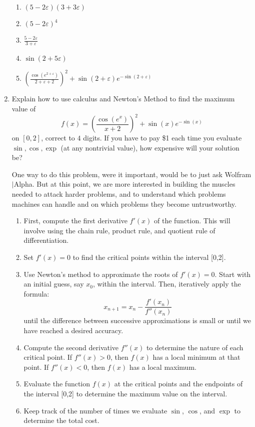 \documentclass[10pt]{article}
\newcommand{\answerbox}[1]{\todo[inline,author={Kartik},color=lightgray,size=normalsize]{#1}}
\theoremstyle{definition}
\begin{document}
\begin{enumerate}[noitemsep]
\begin{enumerate}
        \item $(5-2\varepsilon)(3+3\varepsilon)$
        \answerbox{$15+9\varepsilon$}

        \item $(5-2\varepsilon)^4$
        \answerbox{$625-1000\varepsilon$}

        \item $\displaystyle \frac{5-2\varepsilon}{3+\varepsilon}$
        \answerbox{$\frac{15}{9}-\frac{11}{9}\varepsilon$}

        \item $\sin(2+5\varepsilon)$
        \answerbox{$\sin(2)+5\cos{2} \varepsilon$}

        \item $\displaystyle \left(\frac{\cos \left(e^{2+\varepsilon}\right)}{2+\varepsilon+2}\right)^2+\sin (2+\varepsilon) e^{-\sin (2+\varepsilon)}$
        \answerbox{Confused}

    \end{enumerate}
    \item Explain how to use calculus and Newton's Method to find the maximum value of $$f(x)=\left(\frac{\cos \left(e^x\right)}{x+2}\right)^2+\sin (x) e^{-\sin (x)}$$ on $[0,2]$, correct to $4$ digits. If you have to pay \$1 each time you evaluate $\sin,\cos,\exp$ (at any nontrivial value), how expensive will your solution be?

    One way to do this problem, were it important, would be to just ask Wolfram$\mid$Alpha. But at this point, we are more interested in building the muscles needed to attack harder problems, and to understand which problems machines can handle and on which problems they become untrustworthy.

    \begin{enumerate}
    \item First, compute the first derivative \(f'(x)\) of the function. This will involve using the chain rule, product rule, and quotient rule of differentiation.
    \item Set \(f'(x) = 0\) to find the critical points within the interval [0,2].
    \item Use Newton's method to approximate the roots of \(f'(x) = 0\). Start with an initial guess, say \(x_0\), within the interval. Then, iteratively apply the formula:
    \[ x_{n+1} = x_n - \frac{f'(x_n)}{f''(x_n)} \]
    until the difference between successive approximations is small or until we have reached a desired accuracy.
    \item Compute the second derivative \(f''(x)\) to determine the nature of each critical point. If \(f''(x) > 0\), then \(f(x)\) has a local minimum at that point. If \(f''(x) < 0\), then \(f(x)\) has a local maximum.
    \item Evaluate the function \(f(x)\) at the critical points and the endpoints of the interval [0,2] to determine the maximum value on the interval.
    \item Keep track of the number of times we evaluate \(\sin\), \(\cos\), and \(\exp\) to determine the total cost.
\end{enumerate}
\end{enumerate}
\end{document}
